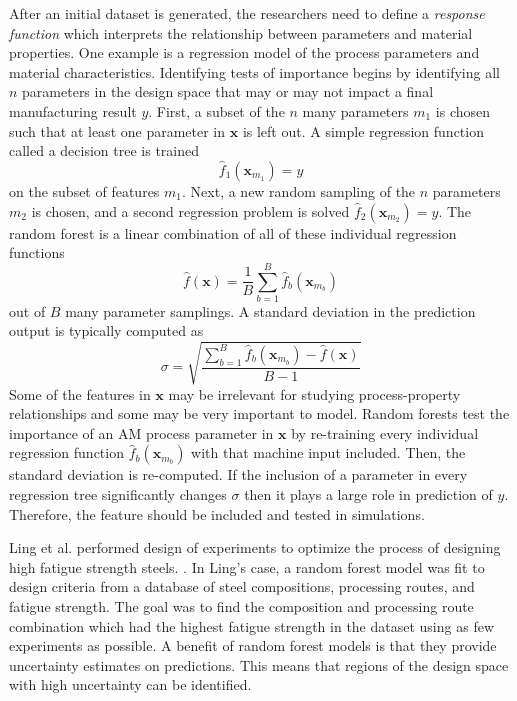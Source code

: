 After an initial dataset is generated, the researchers need to define a \textit{response function} which interprets the relationship between parameters and material properties. One example is a regression model of the process parameters and material characteristics. Identifying tests of importance begins by identifying all $n$ parameters in the design space that may or may not impact a final manufacturing result $y$. First, a subset of the $n$ many parameters $m_1$ is chosen such that at least one parameter in $\mathbf{x}$ is left out. A simple regression function called a decision tree is trained
\begin{equation}
	\hat{f}_1(\mathbf{x}_{m_1}) = y
\end{equation}
on the subset of features $m_1$. Next, a new random sampling of the $n$ parameters $m_2$ is chosen, and a second regression problem is solved $\hat{f}_2(\mathbf{x}_{m_2}) = y$. The random forest is a linear combination of all of these individual regression functions
\begin{equation}
	\hat{f}(\mathbf{x}) = \frac{1}{B} \sum_{b=1}^{B} \hat{f}_b(\mathbf{x}_{m_b})
	\label{randomforest}
\end{equation}
out of $B$ many parameter samplings. A standard deviation in the prediction output is typically computed as
\begin{equation}
	\sigma = \sqrt{\frac{\sum_{b=1}^B \hat{f}_b(\mathbf{x}_{m_b}) - \hat{f}(\mathbf{x})}{B-1}}
	\label{rfstddev}
\end{equation}
Some of the features in $\mathbf{x}$ may be irrelevant for studying process-property relationships and some may be very important to model. Random forests test the importance of an AM process parameter in $\mathbf{x}$ by re-training every individual regression function $\hat{f}_b(\mathbf{x}_{m_b})$ with that machine input included. Then, the standard deviation is re-computed. If the inclusion of a parameter in every regression tree significantly changes $\sigma$ then it plays a large role in prediction of $y$. Therefore, the feature should be included and tested in simulations.

Ling et al. performed design of experiments to optimize the process of designing high fatigue strength steels. \cite{Ling2017a}. In Ling's case, a random forest model was fit to design criteria from a database of steel compositions, processing routes, and fatigue strength. The goal was to find the composition and processing route combination which had the highest fatigue strength in the dataset using as few experiments as possible. A benefit of random forest models is that they provide uncertainty estimates on predictions. This means that regions of the design space with high uncertainty can be identified.

